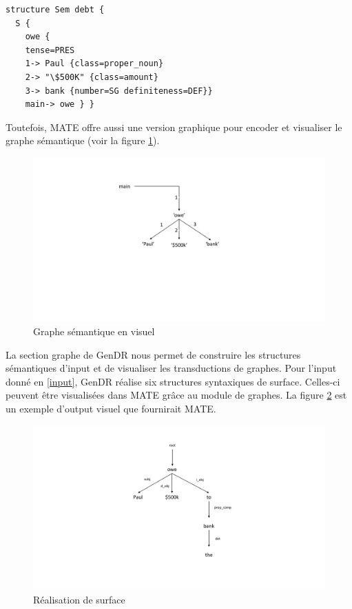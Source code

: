 \begin{lstlisting}[language=XML, caption = Input sémantique, label=input]
structure Sem debt {
  S {
    owe {
    tense=PRES
    1-> Paul {class=proper_noun}
    2-> "\$500K" {class=amount}
    3-> bank {number=SG definiteness=DEF}}
    main-> owe } }
\end{lstlisting}

Toutefois, MATE offre aussi une version graphique pour encoder et visualiser le graphe sémantique (voir la figure \ref{fig:graphesem}).

\begin{figure}[htb]
	\centering
	\includegraphics[width=1\textwidth, trim = {0cm 4cm 0cm 3cm},clip]{ch3/figs/owe_sem.pdf}
	\caption{Graphe sémantique en visuel}
	\label{fig:graphesem}
\end{figure}

La section graphe de GenDR nous permet de construire les structures sémantiques d'input et de visualiser les transductions de graphes. Pour l'input donné en \ref{input}, GenDR réalise six structures syntaxiques de surface. Celles-ci peuvent être visualisées dans MATE grâce au module de graphes. La figure \ref{fig:realsurfex} est un exemple d'output visuel que fournirait MATE. 

\begin{figure}[htb]
	\centering
	\includegraphics[width=1\textwidth, trim = {0cm 2cm 0cm 2cm},clip]{ch3/figs/realsurfex.pdf}
	\caption{Réalisation de surface}
	\label{fig:realsurfex}
\end{figure}

